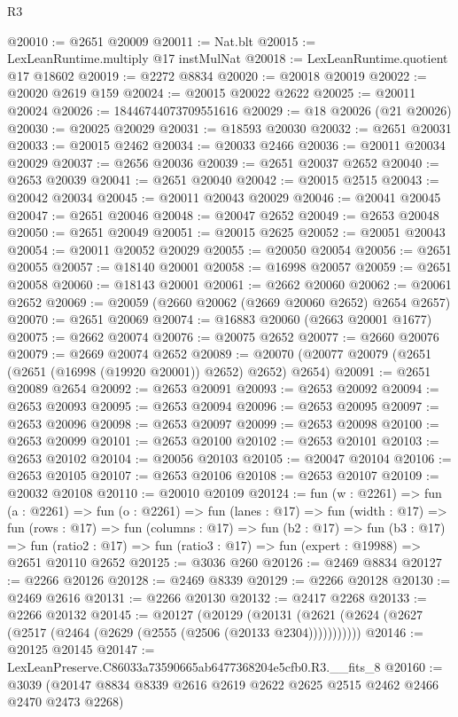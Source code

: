 \begin{lexlean}{R3}
\begin{coremodule}
@20010 := @2651 @20009
@20011 := Nat.blt
@20015 := LexLeanRuntime.multiply @17 instMulNat
@20018 := LexLeanRuntime.quotient @17 @18602
@20019 := @2272 @8834
@20020 := @20018 @20019
@20022 := @20020 @2619 @159
@20024 := @20015 @20022 @2622
@20025 := @20011 @20024
@20026 := 18446744073709551616
@20029 := @18 @20026 (@21 @20026)
@20030 := @20025 @20029
@20031 := @18593 @20030
@20032 := @2651 @20031
@20033 := @20015 @2462
@20034 := @20033 @2466
@20036 := @20011 @20034 @20029
@20037 := @2656 @20036
@20039 := @2651 @20037 @2652
@20040 := @2653 @20039
@20041 := @2651 @20040
@20042 := @20015 @2515
@20043 := @20042 @20034
@20045 := @20011 @20043 @20029
@20046 := @20041 @20045
@20047 := @2651 @20046
@20048 := @20047 @2652
@20049 := @2653 @20048
@20050 := @2651 @20049
@20051 := @20015 @2625
@20052 := @20051 @20043
@20054 := @20011 @20052 @20029
@20055 := @20050 @20054
@20056 := @2651 @20055
@20057 := @18140 @20001
@20058 := @16998 @20057
@20059 := @2651 @20058
@20060 := @18143 @20001
@20061 := @2662 @20060
@20062 := @20061 @2652
@20069 := @20059 (@2660 @20062 (@2669 @20060 @2652) @2654 @2657)
@20070 := @2651 @20069
@20074 := @16883 @20060 (@2663 @20001 @1677)
@20075 := @2662 @20074
@20076 := @20075 @2652
@20077 := @2660 @20076
@20079 := @2669 @20074 @2652
@20089 := @20070 (@20077 @20079 (@2651 (@2651 (@16998 (@19920 @20001)) @2652) @2652) @2654)
@20091 := @2651 @20089 @2654
@20092 := @2653 @20091
@20093 := @2653 @20092
@20094 := @2653 @20093
@20095 := @2653 @20094
@20096 := @2653 @20095
@20097 := @2653 @20096
@20098 := @2653 @20097
@20099 := @2653 @20098
@20100 := @2653 @20099
@20101 := @2653 @20100
@20102 := @2653 @20101
@20103 := @2653 @20102
@20104 := @20056 @20103
@20105 := @20047 @20104
@20106 := @2653 @20105
@20107 := @2653 @20106
@20108 := @2653 @20107
@20109 := @20032 @20108
@20110 := @20010 @20109
@20124 := fun (w : @2261) =>
  fun (a : @2261) =>
  fun (o : @2261) =>
  fun (lanes : @17) =>
  fun (width : @17) =>
  fun (rows : @17) =>
  fun (columns : @17) =>
  fun (b2 : @17) =>
  fun (b3 : @17) =>
  fun (ratio2 : @17) => fun (ratio3 : @17) => fun (expert : @19988) => @2651 @20110 @2652
@20125 := @3036 @260
@20126 := @2469 @8834
@20127 := @2266 @20126
@20128 := @2469 @8339
@20129 := @2266 @20128
@20130 := @2469 @2616
@20131 := @2266 @20130
@20132 := @2417 @2268
@20133 := @2266 @20132
@20145 := @20127
    (@20129 (@20131 (@2621 (@2624 (@2627 (@2517 (@2464 (@2629 (@2555 (@2506 (@20133 @2304)))))))))))
@20146 := @20125 @20145
@20147 := LexLeanPreserve.C86033a73590665ab6477368204e5cfb0.R3.__fits_8
@20160 := @3039 (@20147 @8834 @8339 @2616 @2619 @2622 @2625 @2515 @2462 @2466 @2470 @2473 @2268)

\end{coremodule}
\end{lexlean}
